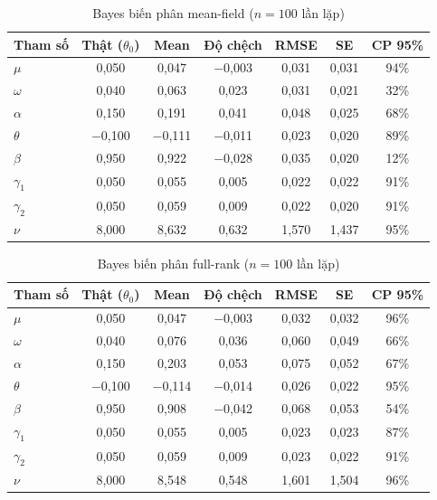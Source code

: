 \documentclass[11pt,a4paper]{article}
\begin{document}
\begin{table}[H]\centering\scriptsize
\caption{Bayes biến phân mean-field ($n=100$ lần lặp)}
\begin{tabularx}{\textwidth}{l C C C C C C}
\toprule
\textbf{Tham số} & \textbf{Thật ($\theta_0$)} & \textbf{Mean} & \textbf{Độ chệch} & \textbf{RMSE} & \textbf{SE} & \textbf{CP 95\%} \\
\midrule
$\mu$ & 0,050 & 0,047 & $-$0,003 & 0,031 & 0,031 & 94\% \\
$\omega$ & 0,040 & 0,063 & 0,023 & 0,031 & 0,021 & 32\% \\
$\alpha$ & 0,150 & 0,191 & 0,041 & 0,048 & 0,025 & 68\% \\
$\theta$ & $-$0,100 & $-$0,111 & $-$0,011 & 0,023 & 0,020 & 89\% \\
$\beta$ & 0,950 & 0,922 & $-$0,028 & 0,035 & 0,020 & 12\% \\
$\gamma_1$ & 0,050 & 0,055 & 0,005 & 0,022 & 0,022 & 91\% \\
$\gamma_2$ & 0,050 & 0,059 & 0,009 & 0,022 & 0,020 & 91\% \\
$\nu$ & 8,000 & 8,632 & 0,632 & 1,570 & 1,437 & 95\% \\
\bottomrule
\end{tabularx}
\end{table}

\begin{table}[H]\centering\scriptsize
\caption{Bayes biến phân full-rank ($n=100$ lần lặp)}
\begin{tabularx}{\textwidth}{l C C C C C C}
\toprule
\textbf{Tham số} & \textbf{Thật ($\theta_0$)} & \textbf{Mean} & \textbf{Độ chệch} & \textbf{RMSE} & \textbf{SE} & \textbf{CP 95\%} \\
\midrule
$\mu$ & 0,050 & 0,047 & $-$0,003 & 0,032 & 0,032 & 96\% \\
$\omega$ & 0,040 & 0,076 & 0,036 & 0,060 & 0,049 & 66\% \\
$\alpha$ & 0,150 & 0,203 & 0,053 & 0,075 & 0,052 & 67\% \\
$\theta$ & $-$0,100 & $-$0,114 & $-$0,014 & 0,026 & 0,022 & 95\% \\
$\beta$ & 0,950 & 0,908 & $-$0,042 & 0,068 & 0,053 & 54\% \\
$\gamma_1$ & 0,050 & 0,055 & 0,005 & 0,023 & 0,023 & 87\% \\
$\gamma_2$ & 0,050 & 0,059 & 0,009 & 0,023 & 0,022 & 91\% \\
$\nu$ & 8,000 & 8,548 & 0,548 & 1,601 & 1,504 & 96\% \\
\bottomrule
\end{tabularx}
\end{table}
\end{document}
